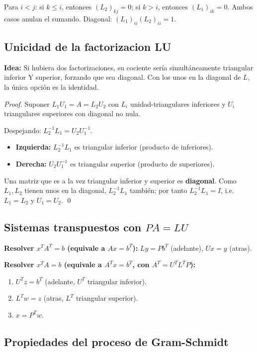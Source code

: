\documentclass[11pt,a4paper]{article}
\begin{document}
Para $i<j$: si $k\le i$, entonces $(L_2)_{kj}=0$; si $k>i$, entonces $(L_1)_{ik}=0$.
Ambos casos anulan el sumando. Diagonal: $(L_1)_{ii}(L_2)_{ii}=1$.

\subsection{Unicidad de la factorizacion LU}
\label{sec:unicidad_lu}

\textbf{Idea:} Si hubiera dos factorizaciones, su cociente sería simultáneamente triangular inferior Y superior, forzando que sea diagonal. Con los unos en la diagonal de $L$, la única opción es la identidad.

\begin{proof}
Suponer $L_1U_1 = A = L_2U_2$ con $L_i$ unidad-triangulares inferiores y $U_i$ triangulares superiores con diagonal no nula.

Despejando: $L_2^{-1}L_1 = U_2U_1^{-1}$.
\begin{itemize}[noitemsep]
  \item \textbf{Izquierda:} $L_2^{-1}L_1$ es triangular inferior (producto de inferiores).
  \item \textbf{Derecha:} $U_2U_1^{-1}$ es triangular superior (producto de superiores).
\end{itemize}
Una matriz que es a la vez triangular inferior y superior es \textbf{diagonal}. Como $L_1, L_2$ tienen unos en la diagonal, $L_2^{-1}L_1$ también; por tanto $L_2^{-1}L_1 = I$, i.e.\ $L_1=L_2$ y $U_1=U_2$. \qed
\end{proof}

\subsection{Sistemas transpuestos con $PA=LU$}
\label{sec:sistemas_transpuestos}

\textbf{Resolver $x^TA^T=b$ (equivale a $Ax=b^T$):}
$Ly=Pb^T$ (adelante), $Ux=y$ (atras).

\textbf{Resolver $x^TA=b$ (equivale a $A^Tx=b^T$, con $A^T=U^TL^TP$):}
\begin{enumerate}[noitemsep]
  \item $U^Tz=b^T$ (adelante, $U^T$ triangular inferior).
  \item $L^Tw=z$ (atras, $L^T$ triangular superior).
  \item $x=P^Tw$.
\end{enumerate}

\subsection{Propiedades del proceso de Gram-Schmidt}
\end{document}
